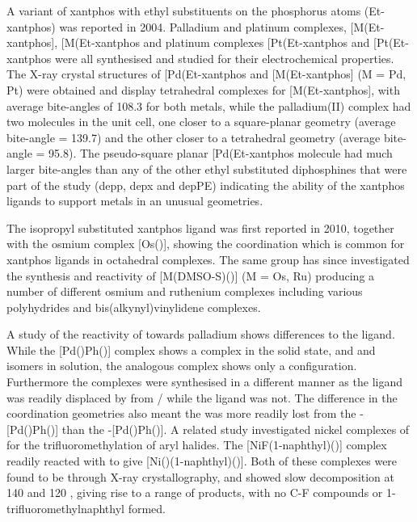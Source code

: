 A variant of xantphos with ethyl substituents on the phosphorus atoms (Et-xantphos) was reported in 2004.\cite{Miedaner2004, Raebiger2004}  Palladium and platinum complexes, [M(Et-xantphos], [M(Et-xantphos\ce{)2]^{2+}} and platinum complexes [Pt(Et-xantphos\ce{)2H]PF6} and [Pt(Et-xantphos\ce{)2(H)2]^{2+}} were all synthesised and studied for their electrochemical properties.  The X-ray crystal structures of [Pd(Et-xantphos\ce{)2]BF4} and [M(Et-xantphos] (M = Pd, Pt) were obtained and display tetrahedral complexes for [M(Et-xantphos], with average bite-angles of 108.3\degrees{} for both metals, while the palladium(II) complex had two molecules in the unit cell, one closer to a square-planar geometry (average bite-angle = 139.7\degrees) and the other closer to a tetrahedral geometry (average bite-angle = 95.8\degrees).  The pseudo-square planar [Pd(Et-xantphos\ce{)2]BF4} molecule had much larger bite-angles than any of the other ethyl substituted diphosphines that were part of the study (\gls{depp}, \gls{depx} and \gls{depPE}) indicating the ability of the xantphos ligands to support metals in an unusual geometries.  

The isopropyl substituted xantphos ligand \iPrxantphos{} was first reported in 2010, together with the osmium complex [Os(\iPrxantphosk)], showing the \POP{} coordination which is common for xantphos ligands in octahedral complexes.\cite{Asensio2010}  The same group has since investigated the synthesis and reactivity of [M(DMSO-\dento{}S)(\iPrxantphos)] (M = Os, Ru) producing a number of different osmium and ruthenium complexes including various polyhydrides and bis(alkynyl)vinylidene complexes.\cite{Alos2013, Alos2014}  

A study of the reactivity of \iPrxantphos{} towards palladium shows differences to the \Phxantphos{} ligand.\cite{Bakhmutov2012}  While the [Pd()Ph(\Phxantphos)] complex shows a \cis{} complex in the solid state, and \cis{} and \trans{} isomers in solution, the analogous \iPrxantphos{} complex shows only a \trans{} configuration.  Furthermore the complexes were synthesised in a different manner as the \Phxantphos{} ligand was readily displaced by  from / while the \iPrxantphos{} ligand was not.  The difference in the coordination geometries also meant the  was more readily lost from the \cis-[Pd()Ph(\Phxantphos)] than the \trans-[Pd()Ph(\iPrxantphos)].  A related study investigated nickel complexes of \iPrxantphos{} for the trifluoromethylation of aryl halides.\cite{Jover2014}  The [NiF(1-naphthyl)(\iPrxantphos)] complex readily reacted with  to give [Ni()(1-naphthyl)(\iPrxantphos)].  Both of these complexes were found to be \trans{} through X-ray crystallography, and showed slow decomposition at 140 \degC{} and 120 \degC{}, giving rise to a range of products, with no C-F compounds or 1-trifluoromethylnaphthyl formed.  


